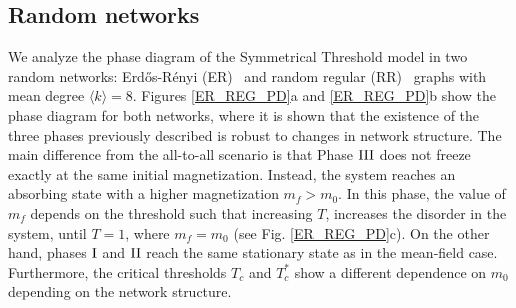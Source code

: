 \subsection{Random networks}

We analyze the phase diagram of the Symmetrical Threshold model in two random networks: Erd\H{o}s-Rényi (ER)~\cite{erdos1960evolution} and random regular (RR)~\cite{wormald_1999} graphs with mean degree $\langle k \rangle = 8$. Figures \ref{ER_REG_PD}a and \ref{ER_REG_PD}b show the phase diagram for both networks, where it is shown that the existence of the three phases previously described is robust to changes in network structure. The main difference from the all-to-all scenario is that Phase ${\rm III}$ does not freeze exactly at the same initial magnetization. Instead, the system reaches an absorbing state with a higher magnetization $m_f > m_0$. In this phase, the value of $m_f$ depends on the threshold such that increasing $T$, increases the disorder in the system, until $T = 1$, where $m_f = m_0$ (see Fig. \ref{ER_REG_PD}c). On the other hand, phases ${\rm I}$ and ${\rm II}$ reach the same stationary state as in the mean-field case. Furthermore, the critical thresholds $T_{c}$ and $T_{c}^{*}$ show a different dependence on $m_0$ depending on the network structure.
